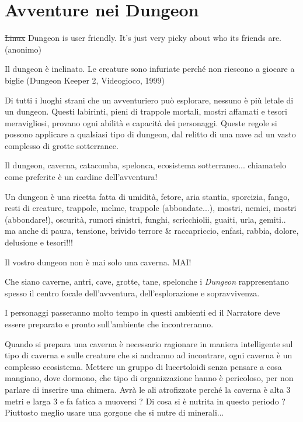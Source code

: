 \section{Avventure nei Dungeon}

\begin{enfasi}{

\st{Linux} Dungeon is user friendly. It's just very picky about who its friends are. (anonimo)

\medskip

Il dungeon è inclinato. Le creature sono infuriate perché non riescono a giocare a biglie (Dungeon Keeper 2, Videogioco, 1999)

}\end{enfasi}

\label{avventure-nei-dungeon}
\begin{multicols}{2}

Di tutti i luoghi strani che un avventuriero può esplorare, nessuno è più letale di un dungeon. Questi labirinti, pieni di trappole mortali, mostri affamati e tesori meravigliosi, provano ogni abilità e capacità dei personaggi. Queste regole si possono applicare a qualsiasi tipo di dungeon, dal relitto di una nave ad un vasto complesso di grotte sotterranee.

\begin{narratore}[Dungeon!!!]
Il dungeon, caverna, catacomba, spelonca, ecosistema sotterraneo... chiamatelo come preferite è un cardine dell'avventura!

Un dungeon è una ricetta fatta di umidità, fetore, aria stantia, sporcizia, fango, resti di creature, trappole, melme, trappole (abbondate...), mostri, nemici, mostri (abbondare!), oscurità, rumori sinistri, funghi, scricchiolii, guaiti, urla, gemiti.. ma anche di paura, tensione, brivido terrore \& raccapriccio, enfasi, rabbia, dolore, delusione e tesori!!!

Il vostro dungeon non è mai solo una caverna. MAI!
\end{narratore}


Che siano caverne, antri, cave, grotte, tane, spelonche i \emph{Dungeon} rappresentano spesso il centro focale dell'avventura, dell'esplorazione e sopravvivenza.

I personaggi passeranno molto tempo in questi ambienti ed il Narratore deve essere preparato e pronto sull'ambiente che incontreranno.

Quando si prepara una caverna è necessario ragionare in maniera intelligente sul tipo di caverna e sulle creature che si andranno ad incontrare, ogni caverna è un complesso ecosistema.
Mettere un gruppo di lucertoloidi senza pensare a cosa mangiano, dove dormono, che tipo di organizzazione hanno è pericoloso, per non parlare di inserire una chimera.
Avrà le ali atrofizzate perché la caverna è alta 3 metri e larga 3 e fa fatica a muoversi ? Di cosa si è nutrita in questo periodo ? Piuttosto meglio usare una gorgone che si nutre di minerali...


\end{multicols}
